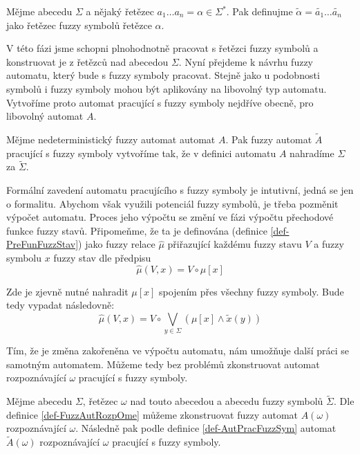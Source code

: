 \documentclass[a4paper,10pt]{article}
\begin{document}

\begin{definition}
Mějme abecedu $\Sigma$ a nějaký řetězec $a_1 \dots a_n = \alpha \in \Sigma^*$. Pak definujme $\widetilde{\alpha} = \widetilde{a_1} \dots \widetilde{a_n}$ jako řetězec fuzzy symbolů řetězce $\alpha$.
\end{definition}

V této fázi jsme schopni plnohodnotně pracovat s řetězci fuzzy symbolů a konstruovat je z řetězců nad abecedou $\Sigma$. Nyní přejdeme k návrhu fuzzy automatu, který bude s fuzzy symboly pracovat. Stejně jako u podobnosti symbolů i fuzzy symboly mohou být aplikovány na libovolný typ automatu. Vytvoříme proto automat pracující s fuzzy symboly nejdříve obecně, pro libovolný automat $A$. 

\begin{definition} \label{def-AutPracFuzzSym}
  Mějme nedeterministický fuzzy automat automat $A$. Pak fuzzy automat $\widetilde{A}$ pracující s fuzzy symboly vytvoříme tak, že v definici automatu $A$ nahradíme $\Sigma$ za $\widetilde{\Sigma}$.
  
\end{definition}

Formální zavedení automatu pracujícího s fuzzy symboly je intutivní, jedná se jen o formalitu. Abychom však využili potenciál fuzzy symbolů, je třeba pozměnit výpočet automatu. Proces jeho výpočtu se změní ve fázi výpočtu přechodové funkce fuzzy stavů. Připomeňme, že ta je definována (definice \ref{def-PreFunFuzzStav}) jako fuzzy relace $\widehat{\mu}$ přiřazující každému fuzzy stavu $V$ a fuzzy symbolu $x$ fuzzy stav dle předpisu
$$
 \widehat{\mu}(V, x) = V \circ \mu[x]
$$

Zde je zjevně nutné nahradit $\mu[x]$ spojením přes všechny fuzzy symboly. Bude tedy vypadat následovně:
$$
 \widehat{\mu}(V, x) = V \circ \bigvee_{y \in \Sigma} (\mu[x] \wedge \widetilde{x}(y))
$$

Tím, že je změna zakořeněna ve výpočtu automatu, nám umožňuje další práci se samotným automatem. Můžeme tedy bez problémů zkonstruovat automat rozpoznávající $\omega$ pracující s fuzzy symboly.

\begin{definition}
 Mějme abecedu $\Sigma$, řetězec $\omega$ nad touto abecedou a abecedu fuzzy symbolů $\widetilde{\Sigma}$. Dle definice \ref{def-FuzzAutRozpOme} můžeme zkonstruovat fuzzy automat $A(\omega)$ rozpoznávající $\omega$. Následně pak podle definice \ref{def-AutPracFuzzSym} automat $\widetilde{A}(\omega)$ rozpoznávající $\omega$ pracující s fuzzy symboly.
\end{definition}
\end{document}
